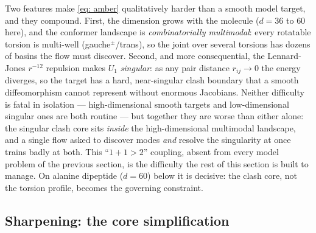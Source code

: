 \documentclass[11pt]{article}
\begin{document}
Two features make \eqref{eq: amber} qualitatively harder than a smooth model target, and they compound. First,
the dimension grows with the molecule ($d = 36$ to $60$ here), and the conformer landscape is
\emph{combinatorially multimodal}: every rotatable torsion is multi-well (gauche$^{\pm}$/trans), so the joint
over several torsions has dozens of basins the flow must discover. Second, and more consequential, the
Lennard-Jones $r^{-12}$ repulsion makes $U_1$ \emph{singular}: as any pair distance $r_{ij} \to 0$ the energy
diverges, so the target has a hard, near-singular clash boundary that a smooth diffeomorphism cannot represent
without enormous Jacobians. Neither difficulty is fatal in isolation --- high-dimensional smooth targets and
low-dimensional singular ones are both routine --- but together they are worse than either alone: the
singular clash core sits \emph{inside} the high-dimensional multimodal landscape, and a single flow asked to
discover modes \emph{and} resolve the singularity at once trains badly at both. This ``$1+1>2$'' coupling,
absent from every model problem of the previous section, is the difficulty the rest of this section is built to
manage. On alanine dipeptide ($d = 60$) below it is decisive: the clash core, not the torsion profile, becomes
the governing constraint.

\subsection{Sharpening: the core simplification}
\label{sec: mol-sharpening}
\end{document}
